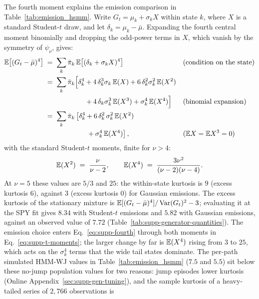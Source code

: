 The fourth moment explains the emission comparison in
Table~\ref{tab:emission_hsmm}. Write $G_t = \mu_k +
\sigma_k X$ within state $k$, where $X$ is a standard Student-$t$
draw, and let $\delta_k = \mu_k - \bar\mu$. Expanding the fourth
central moment binomially and dropping the odd-power terms in $X$,
which vanish by the symmetry of $\psi_\nu$, gives:
\begin{align}
  \mathbb{E}\big[(G_t - \bar\mu)^4\big]
   &\;=\; \sum_k \bar\pi_k\,
     \mathbb{E}\big[(\delta_k + \sigma_k X)^4\big]
     && \text{(condition on the state)} \notag \\
   &\;=\; \sum_k \bar\pi_k \Big[
     \delta_k^4 + 4\, \delta_k^3 \sigma_k\, \mathbb{E}(X)
     + 6\, \delta_k^2 \sigma_k^2\, \mathbb{E}(X^2) \notag \\
   &\hspace{6em}
     + 4\, \delta_k \sigma_k^3\, \mathbb{E}(X^3) + \sigma_k^4\, \mathbb{E}(X^4)\Big]
     && \text{(binomial expansion)} \notag \\
   &\;=\; \sum_k \bar\pi_k \left[
     \delta_k^4
     + 6\, \delta_k^2\, \sigma_k^2\, \mathbb{E}(X^2)\right. \notag \\
   &\hspace{6em}\left.{}
     + \sigma_k^4\, \mathbb{E}(X^4)
     \right],
     && \text{($\mathbb{E} X = \mathbb{E} X^3 = 0$)}
  \label{eq:supp-fourth}
\end{align}
with the standard Student-$t$ moments, finite for $\nu > 4$:
\begin{equation}
  \mathbb{E}(X^2) \;=\; \frac{\nu}{\nu - 2},
  \qquad
  \mathbb{E}(X^4) \;=\; \frac{3 \nu^2}{(\nu - 2)(\nu - 4)}.
  \label{eq:supp-t-moments}
\end{equation}
At $\nu = 5$ these values are $5/3$ and $25$: the within-state
kurtosis is $9$ (excess kurtosis $6$), against $3$ (excess kurtosis
$0$) for Gaussian emissions. The excess kurtosis of the stationary mixture is
$\mathbb{E}[(G_t - \bar\mu)^4] / \operatorname{Var}(G_t)^2 - 3$; evaluating it at the SPY
fit gives $8.34$ with Student-$t$ emissions and $5.82$ with Gaussian
emissions, against an observed value of $7.72$
(Table~\ref{tab:supp-generator-quantities}). The emission choice enters
Eq.~\eqref{eq:supp-fourth} through both moments in
Eq.~\eqref{eq:supp-t-moments}; the larger change by far is
$\mathbb{E}(X^4)$ rising from $3$ to $25$, which acts on the $\sigma_k^4$
terms that the wide tail states dominate. The per-path simulated
HMM-WJ values in Table~\ref{tab:emission_hsmm} ($7.5$ and $5.5$) sit
below these no-jump population values for two reasons: jump episodes
lower kurtosis (Online Appendix~\ref{sec:supp-gen-tuning}), and the
sample kurtosis of a heavy-tailed series of $2{,}766$ observations is
